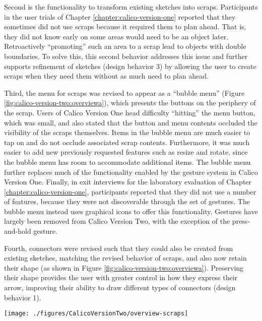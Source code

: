 \documentclass[12pt,fleqn]{ucithesis}
\begin{document}
Second is the functionality to transform existing sketches into scraps. Participants in the user trials of Chapter \ref{chapter:calico-version-one} reported that they sometimes did not use scraps because it required them to plan ahead. That is, they did not know early on some areas would need to be an object later. Retroactively ``promoting'' such an area to a scrap lead to objects with double boundaries. To solve this, this second behavior addresses this issue and further supports refinement of sketches (design behavior 3) by allowing the user to create scraps when they need them without as much need to plan ahead. 

Third, the menu for scraps was revised to appear as a ``bubble menu'' (Figure \ref{fig:calico-version-two:overviewa}), which presents the buttons on the periphery of the scrap. Users of Calico Version One head difficulty ``hitting'' the menu button, which was small, and also stated that the button and menu contents occluded the visibility of the scraps themselves. Items in the bubble menu are much easier to tap on and do not occlude associated scrap contents. Furthermore, it was much easier to add new previously requested features such as resize and rotate, since the bubble menu has room to accommodate additional items. The bubble menu further replaces much of the functionality enabled by the gesture system in Calico Version One. Finally, in exit interviews for the laboratory evaluation of Chapter \ref{chapter:calico-version-one}, participants reported that they did not use a number of features, because they were not discoverable through the set of gestures. The bubble menu instead uses graphical icons to offer this functionality. Gestures have largely been removed from Calico Version Two, with the exception of the press-and-hold gesture.

Fourth, connectors were revised such that they could also be created from existing sketches, matching the revised behavior of scraps, and also now retain their shape (as shown in Figure \ref{fig:calico-version-two:overviewa}). Preserving their shape provides the user with greater control in how they express their arrow, improving their ability to draw different types of connectors (design behavior 1). 

\begin{figure*}[tbh]
  \centering
  \texttt{[image: ./figures/CalicoVersionTwo/overview-scraps]}
  \caption{Regular sketches can be transformed into selection scraps, which can further be made permanent by ``pinning'' the scrap.}
  \label{fig:calico-version-two:overviewa}
\end{figure*}
\end{document}
